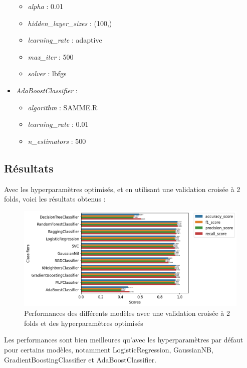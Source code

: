 \documentclass{article}
\begin{document}
\begin{footnotesize}
\begin{multicols}{2}
\begin{itemize}
    \begin{itemize}
        \item \textit{alpha} : 0.01
        \item \textit{hidden\_layer\_sizes} : (100,)
        \item \textit{learning\_rate} : adaptive
        \item \textit{max\_iter} : 500
        \item \textit{solver} : lbfgs
    \end{itemize}
    \item \textit{AdaBoostClassifier} :
    \begin{itemize}
        \item \textit{algorithm} : SAMME.R
        \item \textit{learning\_rate} : 0.01
        \item \textit{n\_estimators} : 500
    \end{itemize}
\end{itemize}
\end{multicols}
\end{footnotesize}

\subsection{Résultats}
Avec les hyperparamètres optimisés, et en utilisant une validation croisée à 2 folds,
voici les résultats obtenus :

\begin{figure}[h]
    \centering
    \includegraphics[width=1.2\textwidth]{img/all_perfs_with_cv_and_best_hp.png}
    \caption{Performances des différents modèles avec une validation croisée à 2 folds et des hyperparamètres optimisés}
\end{figure}

Les performances sont bien meilleures qu'avec les hyperparamètres par défaut pour certains
modèles, notamment LogisticRegression, GaussianNB, GradientBoostingClassifier
et AdaBoostClassifier.
\end{document}
